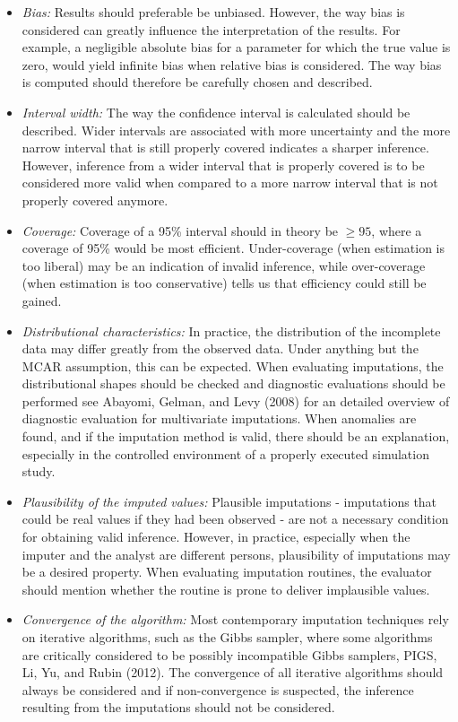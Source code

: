 \documentclass[
]{article}
\providecommand{\tightlist}{%
  \setlength{\itemsep}{0pt}\setlength{\parskip}{0pt}}
\begin{document}
\begin{itemize}
\tightlist
\item
  \emph{Bias:} Results should preferable be unbiased. However, the way
  bias is considered can greatly influence the interpretation of the
  results. For example, a negligible absolute bias for a parameter for
  which the true value is zero, would yield infinite bias when relative
  bias is considered. The way bias is computed should therefore be
  carefully chosen and described.
\item
  \emph{Interval width:} The way the confidence interval is calculated
  should be described. Wider intervals are associated with more
  uncertainty and the more narrow interval that is still properly
  covered indicates a sharper inference. However, inference from a wider
  interval that is properly covered is to be considered more valid when
  compared to a more narrow interval that is not properly covered
  anymore.
\item
  \emph{Coverage:} Coverage of a 95\% interval should in theory be
  \(\geq 95\), where a coverage of 95\% would be most efficient.
  Under-coverage (when estimation is too liberal) may be an indication
  of invalid inference, while over-coverage (when estimation is too
  conservative) tells us that efficiency could still be gained.
\item
  \emph{Distributional characteristics:} In practice, the distribution
  of the incomplete data may differ greatly from the observed data.
  Under anything but the MCAR assumption, this can be expected. When
  evaluating imputations, the distributional shapes should be checked
  and diagnostic evaluations should be performed see Abayomi, Gelman,
  and Levy (2008) for an detailed overview of diagnostic evaluation for
  multivariate imputations. When anomalies are found, and if the
  imputation method is valid, there should be an explanation, especially
  in the controlled environment of a properly executed simulation study.
\item
  \emph{Plausibility of the imputed values:} Plausible imputations -
  imputations that could be real values if they had been observed - are
  not a necessary condition for obtaining valid inference. However, in
  practice, especially when the imputer and the analyst are different
  persons, plausibility of imputations may be a desired property. When
  evaluating imputation routines, the evaluator should mention whether
  the routine is prone to deliver implausible values.
\item
  \emph{Convergence of the algorithm:} Most contemporary imputation
  techniques rely on iterative algorithms, such as the Gibbs sampler,
  where some algorithms are critically considered to be possibly
  incompatible Gibbs samplers, PIGS, Li, Yu, and Rubin (2012). The
  convergence of all iterative algorithms should always be considered
  and if non-convergence is suspected, the inference resulting from the
  imputations should not be considered.
\end{itemize}
\end{document}
